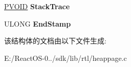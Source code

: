 \begin{DoxyCompactItemize}
\begin{tabbing}
\end{tabbing}\item 
\mbox{\label{struct___d_p_h___b_l_o_c_k___i_n_f_o_r_m_a_t_i_o_n_a44f8181ed5cf83c7b08bb78a488213ab}} 
\hyperlink{interfacevoid}{P\+V\+O\+ID} {\bfseries Stack\+Trace}
\item 
\mbox{\label{struct___d_p_h___b_l_o_c_k___i_n_f_o_r_m_a_t_i_o_n_a9217851943b0ade6887116b9b6ba3000}} 
U\+L\+O\+NG {\bfseries End\+Stamp}
\end{DoxyCompactItemize}


该结构体的文档由以下文件生成\+:\begin{DoxyCompactItemize}
\item 
E\+:/\+React\+O\+S-\/0../sdk/lib/rtl/heappage.\+c\end{DoxyCompactItemize}
